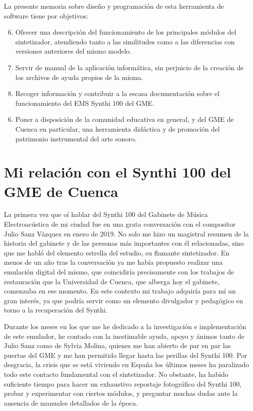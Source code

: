 La presente memoria sobre diseño y programación de esta herramienta de software tiene por objetivos:

\begin{enumerate}
	\setcounter{enumi}{5}
	\item Ofrecer una descripción del funcionamiento de los principales módulos del sintetizador, atendiendo tanto a las similitudes como a las diferencias con versiones anteriores del mismo modelo.
	\item Servir de manual de la aplicación informática, sin perjuicio de la creación de los archivos de ayuda propios de la misma.
	\item Recoger información y contribuir a la escasa documentación sobre el funcionamiento del EMS Synthi 100 del GME.
\end{enumerate}



\begin{enumerate}
	\setcounter{enumi}{5}
	\item Poner a disposición de la comunidad educativa en general, y del GME de Cuenca en particular, una herramienta didáctica y de promoción del patrimonio instrumental del arte sonoro.
\end{enumerate}



\section{Mi relación con el Synthi 100 del GME de Cuenca}

La primera vez que oí hablar del Synthi 100 del Gabinete de Música Electroacústica de mi ciudad fue en una grata conversación con el compositor Julio Sanz Vázquez en enero de 2019. No solo me hizo un magistral resumen de la historia del gabinete y de las personas más importantes con él relacionadas, sino que me habló del elemento estrella del estudio, su flamante sintetizador. En menos de un año tras la conversación ya me había propuesto realizar una emulación digital del mismo, que coincidiría precisamente con los trabajos de restauración que la Universidad de Cuenca, que alberga hoy el gabinete, comenzaba en ese momento. En este contexto mi trabajo adquiría para mí un gran interés, ya que podría servir como un elemento divulgador y pedagógico en torno a la recuperación del Synthi. 

Durante los meses en los que me he dedicado a la investigación e implementación de este emulador, he contado con la inestimable ayuda, apoyo y ánimos tanto de Julio Sanz como de Sylvia Molina, quienes me han abierto de par en par las puertas del GME y me han permitido llegar hasta las perillas del Synthi 100. Por desgracia, la crisis que se está viviendo en España los últimos meses ha paralizado todo este contacto fundamental con el sintetizador. No obstante, ha habido suficiente tiempo para hacer un exhaustivo reportaje fotográfico del Synthi 100, probar y experimentar con ciertos módulos, y preguntar muchas dudas ante la ausencia de manuales detallados de la época.


